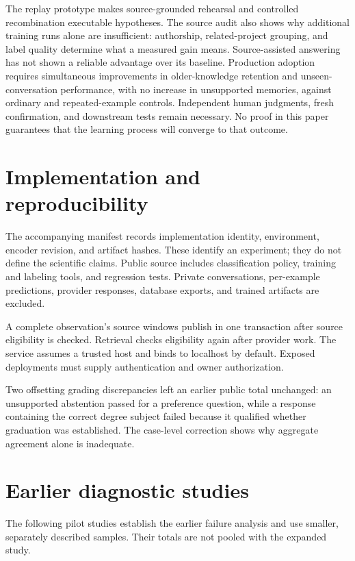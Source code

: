 \documentclass[11pt]{article}
\begin{document}
The replay prototype makes source-grounded rehearsal and controlled recombination executable hypotheses. The source audit also shows why additional training runs alone are insufficient: authorship, related-project grouping, and label quality determine what a measured gain means. Source-assisted answering has not shown a reliable advantage over its baseline. Production adoption requires simultaneous improvements in older-knowledge retention and unseen-conversation performance, with no increase in unsupported memories, against ordinary and repeated-example controls. Independent human judgments, fresh confirmation, and downstream tests remain necessary. No proof in this paper guarantees that the learning process will converge to that outcome.

\clearpage
\appendix
\section{Implementation and reproducibility}
The accompanying manifest records implementation identity, environment, encoder revision, and artifact hashes. These identify an experiment; they do not define the scientific claims. Public source includes classification policy, training and labeling tools, and regression tests. Private conversations, per-example predictions, provider responses, database exports, and trained artifacts are excluded.

A complete observation's source windows publish in one transaction after source eligibility is checked. Retrieval checks eligibility again after provider work. The service assumes a trusted host and binds to localhost by default. Exposed deployments must supply authentication and owner authorization.

Two offsetting grading discrepancies left an earlier public total unchanged: an unsupported abstention passed for a preference question, while a response containing the correct degree subject failed because it qualified whether graduation was established. The case-level correction shows why aggregate agreement alone is inadequate.

\section{Earlier diagnostic studies}
The following pilot studies establish the earlier failure analysis and use smaller, separately described samples. Their totals are not pooled with the expanded study.




\begingroup
\footnotesize
\raggedright
\setlength{\bibsep}{0pt}

\endgroup
\end{document}
